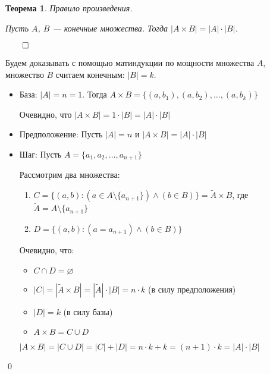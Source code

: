 \documentclass[a4paper,12pt,leqno]{article}
\theoremstyle{plain} %
\newtheorem{theorem}{Теорема}
\theoremstyle{definition} %
\renewenvironment{proof}{$\qed$}{{\qed}} %
\begin{document}
\begin{theorem}
Правило произведения.

Пусть $A$, $B$ --- конечные множества. Тогда $|A \times B| = |A| \cdot |B|$.
\end{theorem}

\begin{proof}

Будем доказывать с помощью матиндукции по мощности множества $A$, множество $B$ считаем конечным: $|B| = k$.

\begin{itemize}
    \item База: $|A| = n = 1$. Тогда $A \times B = \{(a, b_1), (a, b_2),\dots, (a, b_k)\}$
    
    Очевидно, что $|A \times B| = 1 \cdot |B| = |A| \cdot |B|$
    
    \item Предположение: Пусть $|A| = n$ и $|A \times B| = |A| \cdot |B|$
    
    \item Шаг: Пусть $A = \{a_1, a_2,\dots,a_{n+1}\}$
    
    Рассмотрим два множества:
    
    \begin{enumerate}
        \item $C = \{(a, b): (a \in A \setminus \{a_{n+1}\}) \wedge (b \in B)\} = \tilde{A} \times B$, где $\tilde{A} = A \setminus \{a_{n+1}\}$
        
        \item $D = \{(a, b): (a = a_{n+1}) \wedge (b \in B)\}$
    \end{enumerate}
    
    Очевидно, что:
    
    \begin{itemize}
        \item $C \cap D = \varnothing$
        
        \item $|C| = |\tilde{A} \times B| = |\tilde{A}| \cdot |B| = n \cdot k$ (в силу предположения)
        
        \item $|D| = k$ (в силу базы)
        
        \item $A \times B = C \cup D$
    \end{itemize}
    
    $|A \times B| = |C \cup D| = |C| + |D| = n \cdot k + k = (n+1) \cdot k = |A| \cdot |B|$
    
\end{itemize}
\end{proof}
\end{document}

